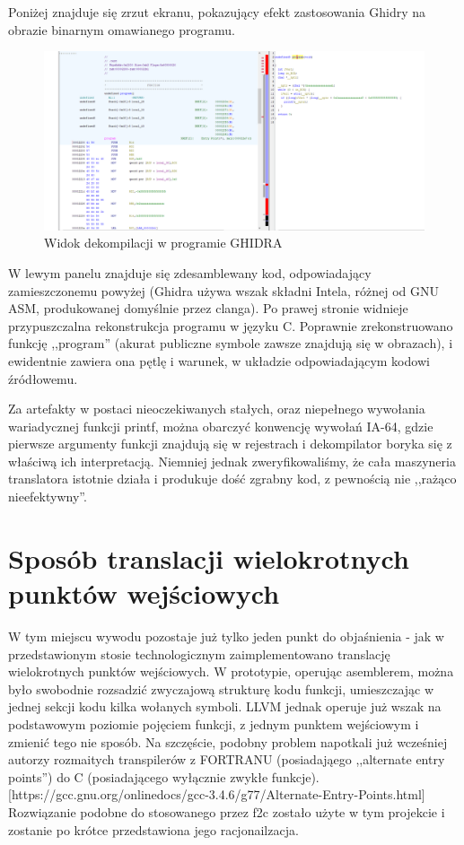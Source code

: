 Poniżej znajduje się zrzut ekranu, pokazujący efekt zastosowania Ghidry na obrazie binarnym omawianego programu.
\begin{figure}[h]
    \centering
    \includegraphics[width=1.3\textwidth]{images/1.progmain/ghidra1.png}
    \caption{Widok dekompilacji w programie GHIDRA}
\end{figure}

W lewym panelu znajduje się zdesamblewany kod, odpowiadający zamieszczonemu powyżej (Ghidra używa wszak składni Intela, różnej od GNU ASM, produkowanej domyślnie przez clanga). Po prawej stronie widnieje przypuszczalna rekonstrukcja programu w języku C. Poprawnie zrekonstruowano funkcję ,,program'' (akurat publiczne symbole zawsze znajdują się w obrazach), i ewidentnie zawiera ona pętlę i warunek, w układzie odpowiadającym kodowi źródłowemu. 

Za artefakty w postaci nieoczekiwanych stałych, oraz niepełnego wywołania wariadycznej funkcji printf, można obarczyć konwencję wywołań IA-64, gdzie pierwsze argumenty funkcji znajdują się w rejestrach i dekompilator boryka się z właściwą ich interpretacją.
Niemniej jednak zweryfikowaliśmy, że cała maszyneria translatora istotnie działa i produkuje dość zgrabny kod, z pewnością nie ,,rażąco nieefektywny''.

\section{Sposób translacji wielokrotnych punktów wejściowych}
W tym miejscu wywodu pozostaje już tylko jeden punkt do objaśnienia - jak w przedstawionym stosie technologicznym zaimplementowano translację wielokrotnych punktów wejściowych. W prototypie, operując asemblerem, można było swobodnie rozsadzić zwyczajową strukturę kodu funkcji, umieszczając w jednej sekcji kodu kilka wołanych symboli. LLVM jednak operuje już wszak na podstawowym poziomie pojęciem funkcji, z jednym punktem wejściowym i zmienić tego nie sposób. Na szczęście, podobny problem napotkali już wcześniej autorzy rozmaitych transpilerów z FORTRANU (posiadająego ,,alternate entry points'') do C (posiadającego wyłącznie zwykłe funkcje).[https://gcc.gnu.org/onlinedocs/gcc-3.4.6/g77/Alternate-Entry-Points.html] Rozwiązanie podobne do stosowanego przez f2c zostało użyte w tym projekcie i zostanie po krótce przedstawiona jego racjonailzacja.

